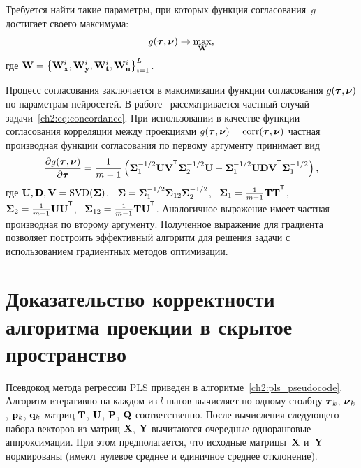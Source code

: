 Требуется найти такие параметры, при которых функция согласования~$g$ достигает своего максимума:
\begin{equation}
	g(\boldsymbol{\tau}, \boldsymbol{\nu}) \rightarrow \max_{\mathbf{W}},
	\label{ch2:eq:concordance}
\end{equation}
где $\mathbf{W} = \bigl\{\mathbf{W}_{\mathbf{x}}^i, \mathbf{W}_{\mathbf{y}}^i, \mathbf{W}_{\mathbf{t}}^i, \mathbf{W}_{\mathbf{u}}^i\bigr\}_{i=1}^L$.

Процесс согласования заключается в максимизации функции согласования $g(\boldsymbol{\tau}, \boldsymbol{\nu})$ по параметрам нейросетей.
В работе~\cite{andrew2013deep} рассматривается частный случай задачи~\eqref{ch2:eq:concordance}. 
При использовании в качестве функции согласования корреляции между проекциями $g(\boldsymbol{\tau}, \boldsymbol{\nu}) = \textnormal{corr}(\boldsymbol{\tau}, \boldsymbol{\nu})$ частная производная функции согласования по первому аргументу принимает вид
\[
	\frac{\partial g(\btau, \bnu)}{\partial \btau} = \frac{1}{m - 1} \left(\bSigma_1^{-1/2} \bU \bV^{\T} \bSigma_2^{-1/2} \bU - \bSigma_1^{-1/2} \bU \bD \bV^{\T} \bSigma_1^{-1/2} \right),
\]
где $\mathbf{U}, \mathbf{D}, \mathbf{V} = \textnormal{SVD}(\boldsymbol{\Sigma})$, \, $\boldsymbol{\Sigma} = \boldsymbol{\Sigma}_1^{-1/2} \boldsymbol{\Sigma}_{12} \boldsymbol{\Sigma}_2^{-1/2} $, \, $\bSigma_1 = \frac{1}{m - 1} \bT \bT^{\T}$, \, $\bSigma_2 = \frac{1}{m - 1} \bU \bU^{\T}$, \, $\bSigma_{12} = \frac{1}{m - 1} \bT \bU^{\T}$.
Аналогичное выражение имеет частная производная по второму аргументу.
Полученное выражение для градиента позволяет построить эффективный алгоритм для решения задачи с использованием градиентных методов оптимизации.

\section{Доказательство корректности алгоритма проекции в скрытое пространство}
\label{sec:ch2:pls_proof}

Псевдокод метода регрессии PLS приведен в алгоритме~\ref{ch2:pls_pseudocode}.
Алгоритм итеративно на каждом из $l$ шагов вычисляет по одному столбцу $\boldsymbol{\tau}_k$, $\boldsymbol{\nu}_k$, $\mathbf{p}_k$, $\mathbf{q}_k$ матриц $\mathbf{T}$, $\mathbf{U}$, $\mathbf{P}$, $\mathbf{Q}$ соответственно. 
После вычисления следующего набора векторов из матриц $\mathbf{X}$, $\mathbf{Y}$ вычитаются очередные одноранговые аппроксимации. 
При этом предполагается, что исходные матрицы~$\mathbf{X}$ и~$\mathbf{Y}$ нормированы (имеют нулевое среднее и единичное среднее отклонение).


